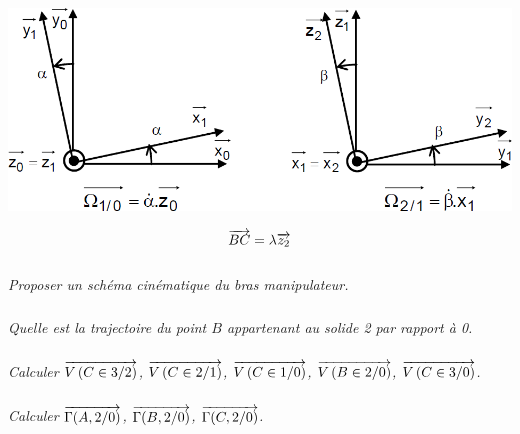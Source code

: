 \documentclass[10pt,fleqn]{article} %
\begin{document}
\begin{multicols}{2}
\begin{center}
\includegraphics[width=\linewidth]{images/parametrage_02}
\end{center}

$$\overrightarrow{BC}=\lambda\overrightarrow{z_2}$$




%
%
%

\subparagraph{}
\textit{Proposer un schéma cinématique du bras manipulateur.}

\subparagraph{}
\textit{Quelle est la trajectoire du point $B$ appartenant au solide 2 par rapport à 0.}
\ifprof
\begin{corrige}
\end{corrige}\else \fi

\subparagraph{}
\textit{Calculer $\overrightarrow{V\left( {C} \in {3}/{2}\right)}$, $\overrightarrow{V\left( {C} \in {2}/{1}\right)}$, $\overrightarrow{V\left( {C} \in {1}/{0}\right)}$, $\overrightarrow{V\left( {B} \in {2}/{0}\right)}$, $\overrightarrow{V\left( {C} \in {3}/{0}\right)}$.}
\ifprof
\begin{corrige}
\end{corrige}\else \fi

\subparagraph{}
\textit{Calculer $\overrightarrow{\Gamma(A,2/0)}$, $\overrightarrow{\Gamma(B,2/0)}$, $\overrightarrow{\Gamma(C,2/0)}$.}
\ifprof
\begin{corrige}
\end{corrige}\else \fi

\end{multicols}
\newpage \setcounter{exo}{0}
\end{document}
